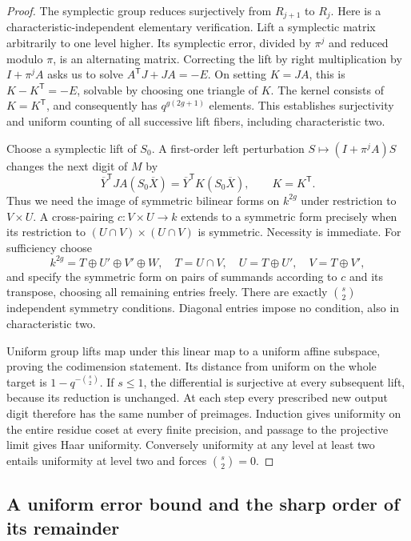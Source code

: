\begin{proof}
The symplectic group reduces surjectively from $R_{j+1}$ to $R_j$.
Here is a characteristic-independent elementary verification. Lift a
symplectic matrix arbitrarily to one level higher. Its symplectic
error, divided by $\pi^j$ and reduced modulo $\pi$, is an alternating
matrix. Correcting the lift by right multiplication by $I+\pi^jA$
asks us to solve
$A^{\mathsf T}J+JA=-E$. On setting $K=JA$, this is
$K-K^{\mathsf T}=-E$, solvable by choosing one triangle of $K$.
The kernel consists of $K=K^{\mathsf T}$, and consequently has
$q^{g(2g+1)}$ elements. This establishes surjectivity and uniform
counting of all successive lift fibers, including characteristic two.

Choose a symplectic lift of $S_0$. A first-order left perturbation
$S\mapsto(I+\pi^jA)S$ changes the next digit of $M$ by
\[
 \overline Y^{\mathsf T}JA(S_0\overline X)
 =\overline Y^{\mathsf T}K(S_0\overline X),\qquad K=K^{\mathsf T}.
\]
Thus we need the image of symmetric bilinear forms on $k^{2g}$ under
restriction to $V\times U$. A cross-pairing $c:V\times U\to k$
extends to a symmetric form precisely when its restriction to
$(U\cap V)\times(U\cap V)$ is symmetric. Necessity is immediate.
For sufficiency choose
\[
 k^{2g}=T\oplus U'\oplus V'\oplus W,
 \quad T=U\cap V,\quad U=T\oplus U',\quad V=T\oplus V',
\]
and specify the symmetric form on pairs of summands according to $c$
and its transpose, choosing all remaining entries freely. There are
exactly $\binom{s}{2}$ independent symmetry conditions. Diagonal
entries impose no condition, also in characteristic two.

Uniform group lifts map under this linear map to a uniform affine
subspace, proving the codimension statement. Its distance from
uniform on the whole target is $1-q^{-\binom{s}{2}}$.
If $s\leq1$, the differential is surjective at every subsequent lift,
because its reduction is unchanged. At each step every prescribed
new output digit therefore has the same number of preimages.
Induction gives uniformity on the entire residue coset at every
finite precision, and passage to the projective limit gives Haar
uniformity. Conversely uniformity at any level at least two entails
uniformity at level two and forces $\binom{s}{2}=0$.
\end{proof}

\subsection{A uniform error bound and the sharp order of its remainder}

